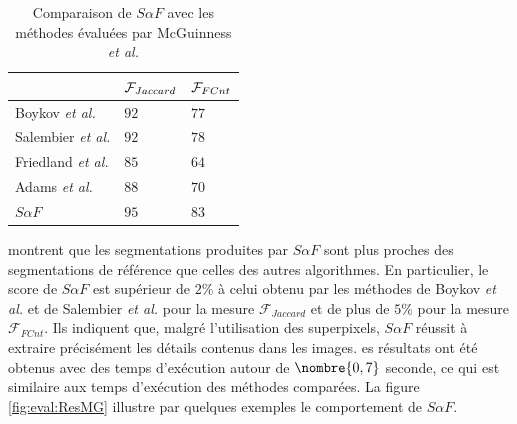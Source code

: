 \begin{table}[H]
\caption{Comparaison de $S \alpha F$ avec les méthodes évaluées par McGuinness \textit{et al.}}
\centering
\begin{tabular}{|l|l|l|}
\hline
\cellcolor{gris}{Algorithme} & $\cellcolor{gris}{\mathcal{F}_{Jaccard}}$ & $\cellcolor{gris}{\mathcal{F}_{FCnt}}$ \\
\hline
Boykov \textit{et al.}& $92$ & $77$ \\
\hline
Salembier \textit{et al.}& $92$ & $78$ \\
\hline
Friedland \textit{et al.}& $85$ & $64$ \\
\hline
Adams \textit{et al.}& $88$ & $70$ \\
\hline
$S \alpha F$& ${95}$ & ${83}$ \\
\hline
\end{tabular}
\label{tab:eval:resbinreg1}
\end{table}

 montrent que les segmentations produites par $S \alpha F$ sont plus proches des segmentations de référence que celles des autres algorithmes. En particulier, le score de $S \alpha F$ est supérieur de $2\%$ à celui obtenu par les méthodes de Boykov \textit{et al.} et de Salembier \textit{et al.} pour la mesure $\mathcal{F}_{Jaccard}$ et de plus de $5\%$ pour la mesure $\mathcal{F}_{FCnt}$. Ils indiquent que, malgré l'utilisation des superpixels, $S \alpha F$ réussit à extraire précisément les détails contenus dans les images. es résultats ont été obtenus avec des temps d'exécution autour de $\nombre{0,7}$ seconde, ce qui est similaire aux temps d'exécution des méthodes comparées. La figure \ref{fig:eval:ResMG} illustre par quelques exemples le comportement de $S \alpha F$.

